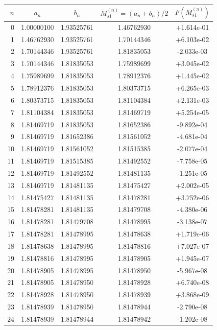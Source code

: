 \begin{tabular}{rcccc}
\toprule
$n$ & $a_n$ & $b_n$ & $M_{s1}^{(n)}=(a_n+b_n)/2$ & $F(M_{s1}^{(n)})$ \\
\midrule
0 & 1.00000100 & 1.93525761 & 1.46762930 & +1.614e-01 \\
1 & 1.46762930 & 1.93525761 & 1.70144346 & +6.103e-02 \\
2 & 1.70144346 & 1.93525761 & 1.81835053 & -2.033e-03 \\
3 & 1.70144346 & 1.81835053 & 1.75989699 & +3.045e-02 \\
4 & 1.75989699 & 1.81835053 & 1.78912376 & +1.445e-02 \\
5 & 1.78912376 & 1.81835053 & 1.80373715 & +6.265e-03 \\
6 & 1.80373715 & 1.81835053 & 1.81104384 & +2.131e-03 \\
7 & 1.81104384 & 1.81835053 & 1.81469719 & +5.254e-05 \\
8 & 1.81469719 & 1.81835053 & 1.81652386 & -9.892e-04 \\
9 & 1.81469719 & 1.81652386 & 1.81561052 & -4.681e-04 \\
10 & 1.81469719 & 1.81561052 & 1.81515385 & -2.077e-04 \\
11 & 1.81469719 & 1.81515385 & 1.81492552 & -7.758e-05 \\
12 & 1.81469719 & 1.81492552 & 1.81481135 & -1.251e-05 \\
13 & 1.81469719 & 1.81481135 & 1.81475427 & +2.002e-05 \\
14 & 1.81475427 & 1.81481135 & 1.81478281 & +3.752e-06 \\
15 & 1.81478281 & 1.81481135 & 1.81479708 & -4.380e-06 \\
16 & 1.81478281 & 1.81479708 & 1.81478995 & -3.138e-07 \\
17 & 1.81478281 & 1.81478995 & 1.81478638 & +1.719e-06 \\
18 & 1.81478638 & 1.81478995 & 1.81478816 & +7.027e-07 \\
19 & 1.81478816 & 1.81478995 & 1.81478905 & +1.945e-07 \\
20 & 1.81478905 & 1.81478995 & 1.81478950 & -5.967e-08 \\
21 & 1.81478905 & 1.81478950 & 1.81478928 & +6.740e-08 \\
22 & 1.81478928 & 1.81478950 & 1.81478939 & +3.868e-09 \\
23 & 1.81478939 & 1.81478950 & 1.81478944 & -2.790e-08 \\
24 & 1.81478939 & 1.81478944 & 1.81478942 & -1.202e-08 \\

\end{tabular}
